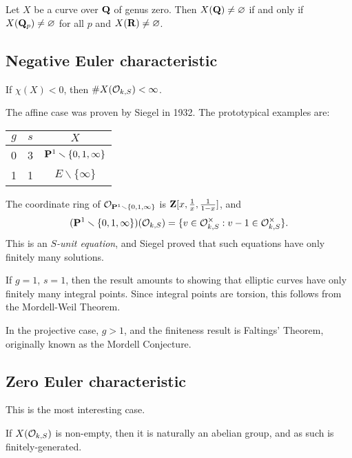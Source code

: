 \begin{theo}
Let $X$ be a curve over $\mathbf{Q}$ of genus zero. Then $X(\mathbf{Q})\ne\varnothing$ if and 
only if $X(\mathbf{Q}_p)\ne\varnothing$ for all $p$ and $X(\mathbf{R})\ne \varnothing$. 
\end{theo}





\subsection{Negative Euler characteristic}

\begin{theo}
If $\chi(X)<0$, then $\# X(\mathcal{O}_{k,S})<\infty$. 
\end{theo}

The affine case was proven by Siegel in 1932. The prototypical examples are: 
\begin{center}
\begin{tabular}{cc|c}
$g$ & $s$ & $X$ \\ \hline
0 & 3 & $\mathbf{P}^1\smallsetminus \{0,1,\infty\}$ \\
1 & 1 & $E\smallsetminus \{\infty\}$ 
\end{tabular}
\end{center}
The coordinate ring of $\mathcal{O}_{\mathbf{P}^1\smallsetminus \{0,1,\infty\}}$ is 
$\mathbf{Z}[x,\frac 1 x,\frac{1}{1-x}]$, and 
\[
  (\mathbf{P}^1\smallsetminus \{0,1,\infty\})(\mathcal{O}_{k,S}) = \{v\in \mathcal{O}_{k,S}^\times:v-1\in \mathcal{O}_{k,S}^\times\} .
\]
This is an \emph{$S$-unit equation}, and Siegel proved that such equations have 
only finitely many solutions. 

If $g=1$, $s=1$, then the result amounts to showing that elliptic curves have 
only finitely many integral points. Since integral points are torsion, this 
follows from the Mordell-Weil Theorem. 

In the projective case, $g>1$, and the finiteness result is Faltings' Theorem, 
originally known as the Mordell Conjecture. 





\subsection{Zero Euler characteristic}

This is the most interesting case. 

\begin{theo}
If $X(\mathcal{O}_{k,S})$ is non-empty, then it is naturally an abelian group, and as 
such is finitely-generated. 
\end{theo}

